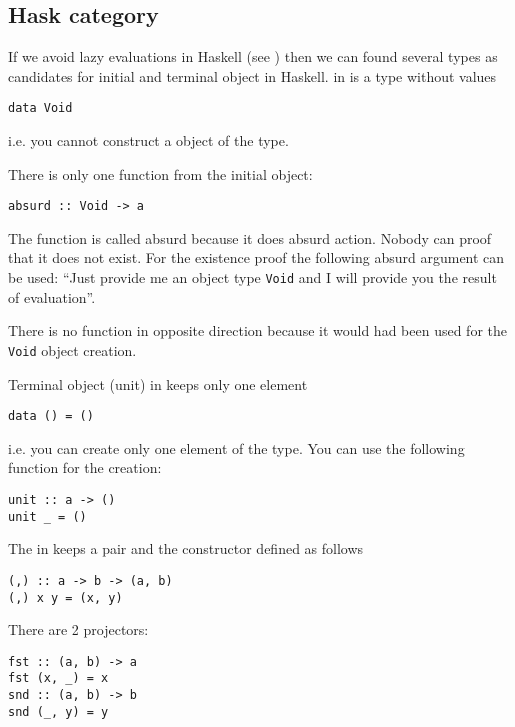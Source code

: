\subsection{\textbf{Hask} category}
\begin{example}
If we avoid lazy evaluations in Haskell (see
) then we can found several types
as candidates for initial and terminal object in Haskell. 
\label{ex:hask_initial_object}
 in  is a
type without values 
\begin{verbatim}
data Void
\end{verbatim}
i.e. you cannot construct a object of the type.

There is only one function from the initial object:
\begin{verbatim}
absurd :: Void -> a
\end{verbatim}
The function is called absurd because it does absurd action. Nobody
can proof that it does not exist. For the existence proof the
following absurd argument can be used: ``Just provide me an object type
\texttt{Void} and I will provide you the result of
evaluation''.  

There is no function in opposite direction because it would had been
used for the \texttt{Void} object creation. 
\end{example}

\begin{example}
\label{ex:hask_terminal_object}
Terminal object (unit) in  keeps only one element
\begin{verbatim}
data () = ()
\end{verbatim}
i.e. you can create only one element of the type. You can use the
following function for the creation:
\begin{verbatim}
unit :: a -> ()
unit _ = ()
\end{verbatim}
\end{example}

\begin{example}
\label{ex:hask_product}
The  in  keeps a
pair and the constructor defined as follows
\begin{verbatim}
(,) :: a -> b -> (a, b)
(,) x y = (x, y)
\end{verbatim}
There are 2 projectors: 
\begin{verbatim}
fst :: (a, b) -> a
fst (x, _) = x
snd :: (a, b) -> b
snd (_, y) = y
\end{verbatim}
\end{example}

